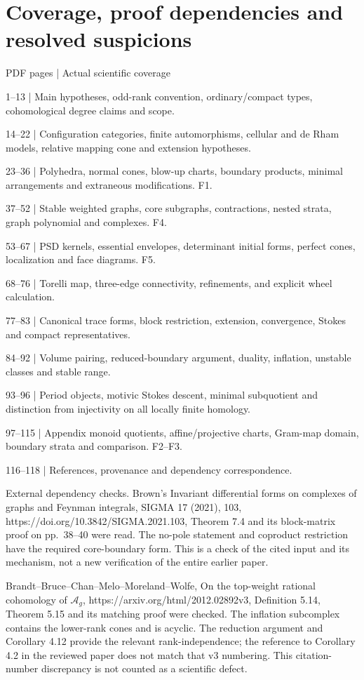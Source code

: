 \documentclass[10pt]{article}
\begin{document}
\section*{Coverage, proof dependencies and resolved suspicions}
PDF pages | Actual scientific coverage\par
1–13 | Main hypotheses, odd-rank convention, ordinary/compact types, cohomological degree claims and scope.\par
14–22 | Configuration categories, finite automorphisms, cellular and de Rham models, relative mapping cone and extension hypotheses.\par
23–36 | Polyhedra, normal cones, blow-up charts, boundary products, minimal arrangements and extraneous modifications. F1.\par
37–52 | Stable weighted graphs, core subgraphs, contractions, nested strata, graph polynomial and complexes. F4.\par
53–67 | PSD kernels, essential envelopes, determinant initial forms, perfect cones, localization and face diagrams. F5.\par
68–76 | Torelli map, three-edge connectivity, refinements, and explicit wheel calculation.\par
77–83 | Canonical trace forms, block restriction, extension, convergence, Stokes and compact representatives.\par
84–92 | Volume pairing, reduced-boundary argument, duality, inflation, unstable classes and stable range.\par
93–96 | Period objects, motivic Stokes descent, minimal subquotient and distinction from injectivity on all locally finite homology.\par
97–115 | Appendix monoid quotients, affine/projective charts, Gram-map domain, boundary strata and comparison. F2–F3.\par
116–118 | References, provenance and dependency correspondence.\par
External dependency checks. Brown’s Invariant differential forms on complexes of graphs and Feynman integrals, SIGMA 17 (2021), 103, https://doi.org/10.3842/SIGMA.2021.103, Theorem 7.4 and its block-matrix proof on pp. 38–40 were read. The no-pole statement and coproduct restriction have the required core-boundary form. This is a check of the cited input and its mechanism, not a new verification of the entire earlier paper.\par
Brandt–Bruce–Chan–Melo–Moreland–Wolfe, On the top-weight rational cohomology of \(\mathcal A_g\), https://arxiv.org/html/2012.02892v3, Definition 5.14, Theorem 5.15 and its matching proof were checked. The inflation subcomplex contains the lower-rank cones and is acyclic. The reduction argument and Corollary 4.12 provide the relevant rank-independence; the reference to Corollary 4.2 in the reviewed paper does not match that v3 numbering. This citation-number discrepancy is not counted as a scientific defect.\par
\end{document}
